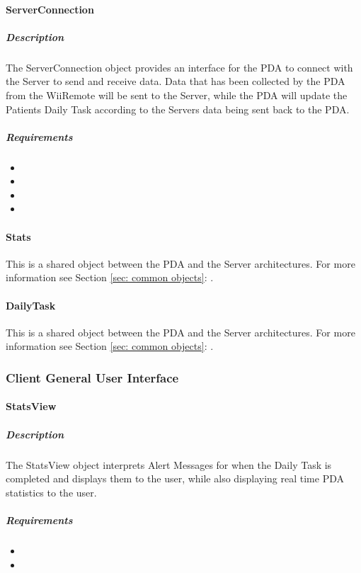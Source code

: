 \documentclass{article}
\begin{document}
\paragraph{ServerConnection}
\subparagraph{Description}
The ServerConnection object provides an interface for the PDA to connect with the Server to send and receive data. Data that has been collected by the PDA from the WiiRemote will be sent to the Server, while the PDA will update the Patients Daily Task according to the Servers data being sent back to the PDA.
\subparagraph{Requirements}
\begin{itemize}
\item {}
\item {}
\item {}
\item {}
\end{itemize}

\paragraph{Stats}
This is a shared object between the PDA and the Server architectures. For more information see Section \ref{sec: common objects}: .

\paragraph{DailyTask}
This is a shared object between the PDA and the Server architectures. For more information see Section \ref{sec: common objects}: .


\subsubsection{Client General User Interface}
\paragraph{StatsView}
\subparagraph{Description}
The StatsView object interprets Alert Messages for when the Daily Task is completed and displays them to the user, while also displaying real time PDA statistics to the user.
\subparagraph{Requirements}
\begin{itemize}
\item {}
\item {}
\end{itemize}
\end{document}
